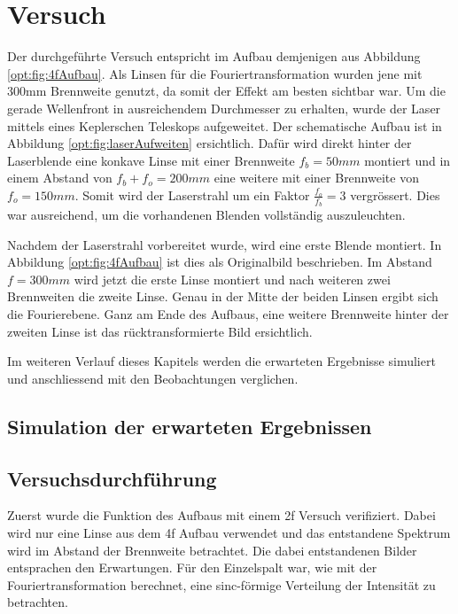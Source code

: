 %
%
%
%
\section{Versuch
  \label{opt:section:versuch}}

Der durchgeführte Versuch entspricht im Aufbau demjenigen aus Abbildung \ref{opt:fig:4fAufbau}.
Als Linsen für die Fouriertransformation wurden jene mit 300mm Brennweite genutzt, da somit der Effekt am besten sichtbar war.
Um die gerade Wellenfront in ausreichendem Durchmesser zu erhalten, wurde der Laser mittels eines Keplerschen Teleskops aufgeweitet.
Der schematische Aufbau ist in Abbildung \ref{opt:fig:laserAufweiten} ersichtlich.
Dafür wird direkt hinter der Laserblende eine konkave Linse mit einer Brennweite $f_b = 50mm$ montiert 
und in einem Abstand von $f_b + f_o = 200mm$ eine weitere mit einer Brennweite von $f_o = 150mm$.
Somit wird der Laserstrahl um ein Faktor $\frac{f_o}{f_b} = 3$ vergrössert.
Dies war ausreichend, um die vorhandenen Blenden vollständig auszuleuchten.

Nachdem der Laserstrahl vorbereitet wurde, wird eine erste Blende montiert.
In Abbildung \ref{opt:fig:4fAufbau} ist dies als Originalbild beschrieben.
Im Abstand $f=300mm$ wird jetzt die erste Linse montiert und nach weiteren zwei Brennweiten die zweite Linse.
Genau in der Mitte der beiden Linsen ergibt sich die Fourierebene.
Ganz am Ende des Aufbaus, eine weitere Brennweite hinter der zweiten Linse ist das rücktransformierte Bild ersichtlich.

Im weiteren Verlauf dieses Kapitels werden die erwarteten Ergebnisse simuliert und anschliessend mit den Beobachtungen verglichen.

\subsection{Simulation der erwarteten Ergebnissen}

\subsection{Versuchsdurchführung}
Zuerst wurde die Funktion des Aufbaus mit einem 2f Versuch verifiziert.
Dabei wird nur eine Linse aus dem 4f Aufbau verwendet und das entstandene Spektrum wird im Abstand der Brennweite betrachtet.
Die dabei entstandenen Bilder entsprachen den Erwartungen.
Für den Einzelspalt war, wie mit der Fouriertransformation berechnet, eine sinc-förmige Verteilung der Intensität zu betrachten.

